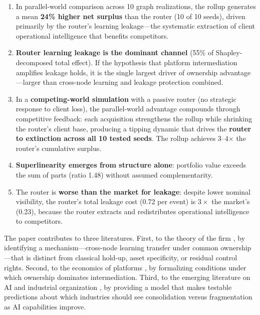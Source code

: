\documentclass[12pt]{article}
\theoremstyle{definition}
\begin{document}
\begin{enumerate}[leftmargin=*]
\item In parallel-world comparison across 10 graph realizations, the rollup generates a mean \textbf{24\% higher net surplus} than the router (10 of 10 seeds), driven primarily by the router's learning leakage---the systematic extraction of client operational intelligence that benefits competitors.

\item \textbf{Router learning leakage is the dominant channel} (55\% of Shapley-decomposed total effect). If the hypothesis that platform intermediation amplifies leakage holds, it is the single largest driver of ownership advantage---larger than cross-node learning and leakage protection combined.

\item In a \textbf{competing-world simulation} with a passive router (no strategic response to client loss), the parallel-world advantage compounds through competitive feedback: each acquisition strengthens the rollup while shrinking the router's client base, producing a tipping dynamic that drives the \textbf{router to extinction across all 10 tested seeds}. The rollup achieves 3--4$\times$ the router's cumulative surplus.

\item \textbf{Superlinearity emerges from structure alone}: portfolio value exceeds the sum of parts (ratio 1.48) without assumed complementarity.

\item The router is \textbf{worse than the market for leakage}: despite lower nominal visibility, the router's total leakage cost (0.72 per event) is $3\times$ the market's (0.23), because the router extracts and redistributes operational intelligence to competitors.
\end{enumerate}

The paper contributes to three literatures. First, to the theory of the firm \citep{coase1937, williamson1975, grossman1986, hart1990}, by identifying a mechanism---cross-node learning transfer under common ownership---that is distinct from classical hold-up, asset specificity, or residual control rights. Second, to the economics of platforms \citep{rochet2003, parker2016}, by formalizing conditions under which ownership dominates intermediation. Third, to the emerging literature on AI and industrial organization \citep{agrawal2018, brynjolfsson2017}, by providing a model that makes testable predictions about which industries should see consolidation versus fragmentation as AI capabilities improve.
\end{document}
